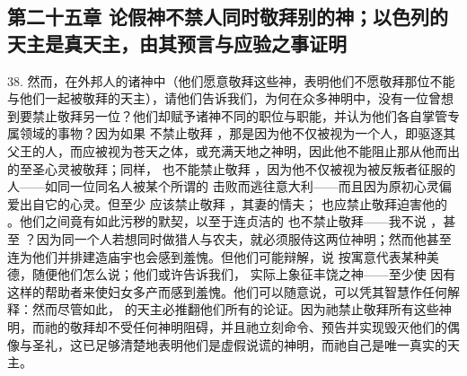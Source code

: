 
\subsection{第二十五章  论假神不禁人同时敬拜别的神；以色列的天主是真天主，由其预言与应验之事证明}

38. 然而，在外邦人的诸神中（他们愿意敬拜这些神，表明他们不愿敬拜那位不能与他们一起被敬拜的天主），请他们告诉我们，为何在众多神明中，没有一位曾想到要禁止敬拜另一位？他们却赋予诸神不同的职位与职能，并认为他们各自掌管专属领域的事物？因为如果  不禁止敬拜 ，那是因为他不仅被视为一个人，即驱逐其父王的人，而应被视为苍天之体，或充满天地之神明，因此他不能阻止那从他而出的至圣心灵被敬拜；同样， 也不能禁止敬拜 ，因为他不仅被视为被反叛者征服的人——如同一位同名人被某个所谓的  击败而逃往意大利——而且因为原初心灵偏爱出自它的心灵。但至少  应该禁止敬拜 ，其妻的情夫； 也应禁止敬拜迫害他的 。他们之间竟有如此污秽的默契，以至于连贞洁的  也不禁止敬拜——我不说 ，甚至 ？因为同一个人若想同时做猎人与农夫，就必须服侍这两位神明；然而他甚至连为他们并排建造庙宇也会感到羞愧。但他们可能辩解，说  按寓意代表某种美德，随便他们怎么说；他们或许告诉我们， 实际上象征丰饶之神——至少使  因有这样的帮助者来使妇女多产而感到羞愧。他们可以随意说，可以凭其智慧作任何解释：然而尽管如此， 的天主必推翻他们所有的论证。因为祂禁止敬拜所有这些神明，而祂的敬拜却不受任何神明阻碍，并且祂立刻命令、预告并实现毁灭他们的偶像与圣礼，这已足够清楚地表明他们是虚假说谎的神明，而祂自己是唯一真实的天主。\par

